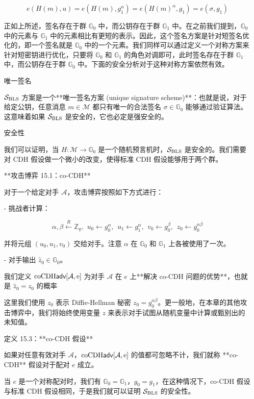 $$
e(H(m),u)=e(H(m),g_1^\alpha)=e(H(m)^\alpha,g_1)=e(\sigma, g_1)
$$

正如上所述，签名存在于群 $\mathbb{G}_0$ 中，而公钥存在于群 $\mathbb{G}_1$ 中。在之前我们提到，$\mathbb{G}_0$ 中的元素与 $\mathbb{G}_1$ 中的元素相比有更短的表示。因此，这个签名方案是针对短签名优化的，即一个签名就是 $\mathbb{G}_0$ 中的一个元素。我们同样可以通过定义一个对称方案来针对短密钥进行优化，只要将 $\mathbb{G}_0$ 和 $\mathbb{G}_1$ 的角色对调即可，此时签名存在于群 $\mathbb{G}_1$ 中，而公钥存在于群 $\mathbb{G}_0$ 中。下面的安全分析对于这种对称方案依然有效。

唯一签名

$\mathcal{S}_{\rm BLS}$ 方案是一个**唯一签名方案 (unique signature scheme)**：也就是说，对于给定公钥，任意消息 $m\in\mathcal{M}$ 都只有唯一的合法签名 $\sigma \in \mathbb{G}_0$  能够通过验证算法。这意味着如果 $\mathcal{S}_{\rm BLS}$ 是安全的，它也必定是强安全的。

安全性

我们可以证明，当 $H: \mathcal{M} \to \mathbb{G}_0$ 是一个随机预言机时，$\mathcal{S}_{\rm BLS}$ 是安全的。我们需要对 CDH 假设做一个微小的改变，使得标准 CDH 假设能够用于两个群。

**攻击博弈 15.1：co-CDH**

对于一个给定对手 $\mathcal{A}$，攻击博弈按照如下方式进行：

- 挑战者计算：
    
    $$
    \alpha,\beta \stackrel{R}\leftarrow \mathbb{Z}_q,~~
    u_0 \leftarrow g_0^\alpha,~~
    u_1 \leftarrow g_1^\alpha,~~
    v_0 \leftarrow g_0^\beta,~~
    z_0 \leftarrow g_0^{\alpha\beta}
    $$
    
    并将元组 $(u_0, u_1, v_0)$ 交给对手。注意 $\alpha$ 在 $\mathbb{G}_0$ 和 $\mathbb{G}_1$ 上各被使用了一次。
    
- 对手输出 $\hat{z}_0 \in \mathbb{G}_0$。

我们定义 $\rm{coCDH\mathsf{adv}}[\mathcal{A},e]$ 为对手 $\mathcal{A}$ 在 $e$ 上**解决 co-CDH 问题的优势**，也就是 $\hat{z}_0 = z_0$ 的概率

这里我们使用 $z_0$ 表示 Diffie-Hellman 秘密 $z_0 = g_0^{\alpha\beta}$。更一般地，在本章的其他攻击博弈中，我们将始终使用变量 $z$ 来表示对手试图从随机变量中计算或甄别出的未知值。

定义 15.3：**co-CDH 假设**

如果对任意有效对手 $\mathcal{A}$，$\rm{coCDH\mathsf{adv}}[\mathcal{A},e]$ 的值都可忽略不计，我们就称 **co-CDH** 假设对于配对 $e$ 成立。

当 $e$ 是一个对称配对时，我们有 $\mathbb{G}_0=\mathbb{G}_1$，$g_0=g_1$，在这种情况下，co-CDH 假设与标准 CDH 假设相同，于是我们就可以证明 $\mathcal{S}_{\rm BLS}$ 的安全性。

